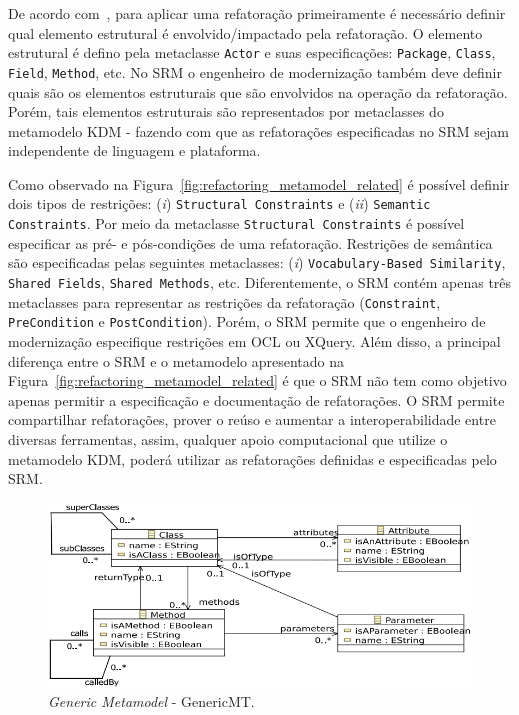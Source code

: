 De acordo com~, para aplicar uma refatoração primeiramente é necessário definir qual elemento estrutural é envolvido/impactado pela refatoração. O elemento estrutural é defino pela metaclasse \texttt{Actor} e suas especificações: \texttt{Package}, \texttt{Class}, \texttt{Field}, \texttt{Method}, etc. No SRM o engenheiro de modernização também deve definir quais são os elementos estruturais que são envolvidos na operação da refatoração. Porém, tais elementos estruturais são representados por metaclasses do metamodelo KDM - fazendo com que as refatorações especificadas no SRM sejam independente de linguagem e plataforma. 

Como observado na Figura~\ref{fig:refactoring_metamodel_related} é possível definir dois tipos de restrições: (\textit{i}) \texttt{Structural Constraints} e (\textit{ii}) \texttt{Semantic Constraints}. Por meio da metaclasse \texttt{Structural Constraints} é possível especificar as pré- e pós-condições de uma refatoração. Restrições de semântica são especificadas pelas seguintes metaclasses: (\textit{i}) \texttt{Vocabulary-Based Similarity}, \texttt{Shared Fields}, \texttt{Shared Methods}, etc. Diferentemente, o SRM contém apenas três metaclasses para representar as restrições da refatoração (\texttt{Constraint}, \texttt{PreCondition} e \texttt{PostCondition}). Porém, o SRM permite que o engenheiro de modernização especifique restrições em OCL ou XQuery. Além disso, a principal diferença entre o SRM e o metamodelo apresentado na Figura~\ref{fig:refactoring_metamodel_related} é que o SRM não tem como objetivo apenas permitir a especificação e documentação de refatorações. O SRM permite compartilhar refatorações, prover o reúso e aumentar a interoperabilidade entre diversas ferramentas, assim, qualquer apoio computacional que utilize o metamodelo KDM, poderá utilizar as refatorações definidas e especificadas pelo SRM.

\begin{figure}[h]
	\centering
	\caption{\textit{Generic Metamodel} - GenericMT.}
	\label{fig:genericMt}
	\includegraphics[scale=0.45]{images/GenericMT}
\end{figure}

